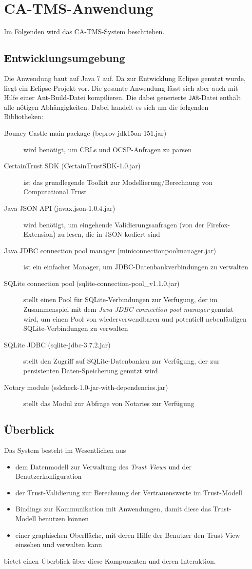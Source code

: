 \documentclass[accentcolor=tud1c,article,colorback,11pt]{tudreport}
\begin{document}
\section{CA-TMS-Anwendung}

Im Folgenden wird das CA-TMS-System beschrieben.

\subsection{Entwicklungsumgebung}
Die Anwendung baut auf Java 7 auf. Da zur Entwicklung Eclipse genutzt wurde, liegt ein Eclipse-Projekt vor. Die gesamte Anwendung lässt sich aber auch mit Hilfe einer Ant-Build-Datei kompilieren. Die dabei generierte \texttt{JAR}-Datei enthält alle nötigen Abhängigkeiten. Dabei handelt es sich um die folgenden Bibliotheken:
\begin{description}
\item[Bouncy Castle main package (bcprov-jdk15on-151.jar)] wird benötigt, um CRLs und OCSP-Anfragen zu parsen
\item[CertainTrust SDK (CertainTrustSDK-1.0.jar)] ist das grundlegende Toolkit zur Modellierung/Berechnung von Computational Trust
\item[Java JSON API (javax.json-1.0.4.jar)] wird benötigt, um eingehende Validierungsanfragen (von der Firefox-Extension) zu lesen, die in JSON kodiert sind
\item[Java JDBC connection pool manager (miniconnectionpoolmanager.jar)] ist ein einfacher Manager, um JDBC-Datenbankverbindungen zu verwalten
\item[SQLite connection pool (sqlite-connection-pool\_v1.1.0.jar)] stellt einen Pool für SQLite-Verbindungen zur Verfügung, der im Zusammenspiel mit dem \textit{Java JDBC connection pool manager} genutzt wird, um einen Pool von wiederverwendbaren und potentiell nebenläufigen SQLite-Verbindungen zu verwalten
\item[SQLite JDBC (sqlite-jdbc-3.7.2.jar)] stellt den Zugriff auf SQLite-Datenbanken zur Verfügung, der zur persistenten Daten-Speicherung genutzt wird
\item[Notary module (sslcheck-1.0-jar-with-dependencies.jar)] stellt das Modul zur Abfrage von Notaries zur Verfügung
\end{description}

\subsection{Überblick}
Das System besteht im Wesentlichen aus
\begin{itemize}
\item dem Datenmodell zur Verwaltung des \textit{Trust Views} und der Benutzerkonfiguration
\item der Trust-Validierung zur Berechnung der Vertrauenswerte im Trust-Modell
\item Bindings zur Kommunikation mit Anwendungen, damit diese das Trust-Modell benutzen können
\item einer graphischen Oberfläche, mit deren Hilfe der Benutzer den Trust View  einsehen und verwalten kann
\end{itemize}
 bietet einen Überblick über diese Komponenten und deren Interaktion.
\end{document}
